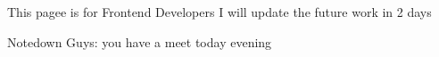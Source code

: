 This pagee is for Frontend Developers 
I will update the future work in 2 days

Notedown Guys:
you have a meet today evening